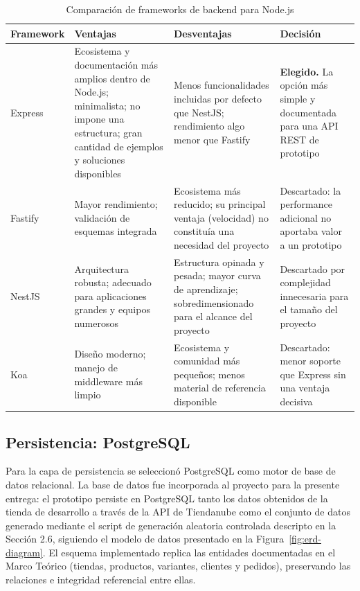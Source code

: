 \begin{table}[h]
\centering
\caption{Comparación de frameworks de backend para Node.js}
\label{tab:comparativo_backend}
\renewcommand{\arraystretch}{1.3}
\begin{tabular}{|m{2.3cm}|m{4.4cm}|m{4.4cm}|m{3.4cm}|}
\hline
\textbf{Framework} & \textbf{Ventajas} & \textbf{Desventajas} & \textbf{Decisión} \\
\hline
Express & Ecosistema y documentación más amplios dentro de Node.js; minimalista; no impone una estructura; gran cantidad de ejemplos y soluciones disponibles & Menos funcionalidades incluidas por defecto que NestJS; rendimiento algo menor que Fastify & \textbf{Elegido.} La opción más simple y documentada para una API REST de prototipo \\
\hline
Fastify & Mayor rendimiento; validación de esquemas integrada & Ecosistema más reducido; su principal ventaja (velocidad) no constituía una necesidad del proyecto & Descartado: la performance adicional no aportaba valor a un prototipo \\
\hline
NestJS & Arquitectura robusta; adecuado para aplicaciones grandes y equipos numerosos & Estructura opinada y pesada; mayor curva de aprendizaje; sobredimensionado para el alcance del proyecto & Descartado por complejidad innecesaria para el tamaño del proyecto \\
\hline
Koa & Diseño moderno; manejo de middleware más limpio & Ecosistema y comunidad más pequeños; menos material de referencia disponible & Descartado: menor soporte que Express sin una ventaja decisiva \\
\hline
\end{tabular}
\end{table}

\subsection{Persistencia: PostgreSQL}

Para la capa de persistencia se seleccionó PostgreSQL como motor de base de datos relacional. La base de datos fue incorporada al proyecto para la presente entrega: el prototipo persiste en PostgreSQL tanto los datos obtenidos de la tienda de desarrollo a través de la API de Tiendanube como el conjunto de datos generado mediante el script de generación aleatoria controlada descripto en la Sección 2.6, siguiendo el modelo de datos presentado en la Figura~\ref{fig:erd-diagram}. El esquema implementado replica las entidades documentadas en el Marco Teórico (tiendas, productos, variantes, clientes y pedidos), preservando las relaciones e integridad referencial entre ellas.

